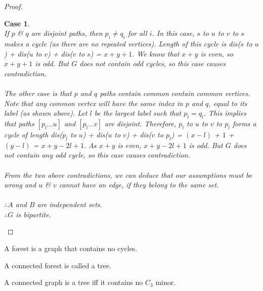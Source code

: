 \documentclass{article}
\newtheorem{case}{Case}
\begin{document}
\begin{proof}
\begin{case}
        \\
        If $p$ \& $q$ are disjoint paths, then $p_{i}\ne q_{i}$ for all $i$. In this case, $s$ to $u$ to $v$ to $s$ makes a cycle (as there are no repeated vertices). Length of this cycle is dis($s$ to $u$) + dis($u$ to $v$) + dis($v$ to $s$) = $x+y+1$. We know that $x+y$ is even, so $x+y+1$ is odd. But $G$ does not contain odd cycles, so this case causes contradiction.\\
        \\
        The other case is that $p$ and $q$ paths contain common contain common vertices. Note that any common vertex will have the same index in $p$ and $q$, equal to its label (as shown above). Let $l$ be the largest label such that $p_{l}=q_{l}$. This implies that paths $[p_{l} \dots u]$ and $[p_{l} \dots v]$ are disjoint. Therefore, $p_{l}$ to $u$ to $v$ to $p_{l}$ forms a cycle of length dis($p_{l}$ to $u$) + dis($u$ to $v$) + dis($v$ to $p_{l}$) = $(x-l)$ + $1$ + $(y-l)$ = $x+y-2l+1$. As $x+y$ is even, $x+y-2l+1$ is odd. But $G$ does not contain any odd cycle, so this case causes contradiction.\\
        \\
        From the two above contradictions, we can deduce that our assumptions must be wrong and $u$ \& $v$ cannot have an edge, if they belong to the same set.\\
        \\
        $\therefore A$ and $B$ are independent sets.\\
        $\therefore G$ is bipartite.
    \end{case}
\end{proof}
  
\begin{definition}
    A forest is a graph that contains no cycles.
\end{definition}
\begin{definition}
    A connected forest is called a tree.
\end{definition}
\begin{theorem}
    A connected graph is a tree iff it contains no {$C_3$} minor.
\end{theorem}
\end{document}
